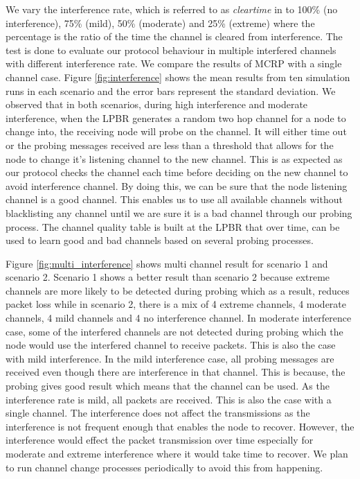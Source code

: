 We vary the interference rate, which is referred to as \emph{clear\textunderscore time} in \cite{Boano:2010:MSM:2127940.2127963} to 100\% (no interference), 75\% (mild), 50\% (moderate) and 25\% (extreme) where the percentage is the ratio of the time the channel is cleared from interference. The test is done to evaluate our protocol behaviour in multiple interfered channels with different interference rate. We compare the results of MCRP with a single channel case. Figure \ref{fig:interference} shows the mean results from ten simulation runs in each scenario and the error bars represent the standard deviation. We observed that in both scenarios, during high interference and moderate interference, when the LPBR generates a random two hop channel for a node to change into, the receiving node will probe on the channel. It will either time out or the probing messages received are less than a threshold that allows for the node to change it's listening channel to the new channel. This is as expected as our protocol checks the channel each time before deciding on the new channel to avoid interference channel. By doing this, we can be sure that the node listening channel is a good channel. This enables us to use all available channels without blacklisting any channel until we are sure it is a bad channel through our probing process. The channel quality table is built at the LPBR that over time, can be used to learn good and bad channels based on several probing processes. 

Figure \ref{fig:multi_interference} shows multi channel result for scenario 1 and scenario 2. Scenario 1 shows a better result than scenario 2 because extreme channels are more likely to be detected during probing which as a result, reduces packet loss while in scenario 2, there is a mix of 4 extreme channels, 4 moderate channels, 4 mild channels and 4 no interference channel. In moderate interference case, some of the interfered channels are not detected during probing which the node would use the interfered channel to receive packets. This is also the case with mild interference.
In the mild interference case, all probing messages are received even though there are interference in that channel. This is because, the probing gives good result which means that the channel can be used. As the interference rate is mild, all packets are received. This is also the case with a single channel. The interference does not affect the transmissions as the interference is not frequent enough that enables the node to recover. However, the interference would effect the packet transmission over time especially for moderate and extreme interference where it would take time to recover. We plan to run channel change processes periodically to avoid this from happening. %


